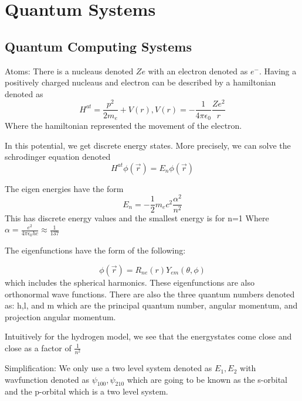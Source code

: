 \chapter{Quantum Systems}
\section{Quantum Computing Systems}
\begin{eg}
Atoms: There is a nucleaus denoted \(Ze\) with an electron denoted as 
\(e^{-}\). Having a positively charged nucleaus and electron can
be described by a hamiltonian denoted as 
\[
  H^{at} = \frac{p^2}{2m_e} + V(r), V(r) = - \frac{1}{4\pi \epsilon_0} \frac{Ze^{2}}{r}
\]  
Where the hamiltonian represented the movement of the electron.

In this potential, we get discrete energy states. More precisely,
we can solve the schrodinger equation denoted 
\[
  H^{at}  \phi (\vec{r}) = E_n \phi (\vec{r})
\]

The eigen energies have the form
\[
  E_n = -\frac{1}{2}m_e c^2 \frac{\alpha^{2}}{n^{2} }
\]
This has discrete energy values and the smallest energy is for n=1 Where
\(\alpha = \frac{e^2}{4\pi \epsilon_0 h c} \approx {\frac{1}{137} }\) 

The eigenfunctions have the form of the following:

\[
  \phi(\vec{r}) = R_{ne}(r) Y_{em}(\theta ,\phi )
\]
which includes the spherical harmonics. These eigenfunctions are 
also orthonormal wave functions. There are also the three quantum numbers
denoted as: h,l, and m which are the principal quantum number,
angular momentum, and projection angular momentum. 

Intuitively for the hydrogen model, we see that the energystates
come close and close as a factor of \( \frac{1}{n^{2} }\)
\begin{remark}
  Simplification: We only use a two level system denoted as 
  \(E_1, E_2\) with wavfunction denoted as \(\psi_{100}, \psi_{210} \) 
  which are going to be known as the s-orbital and the p-orbital which is a 
  two level system.  
\end{remark}
\end{eg}

